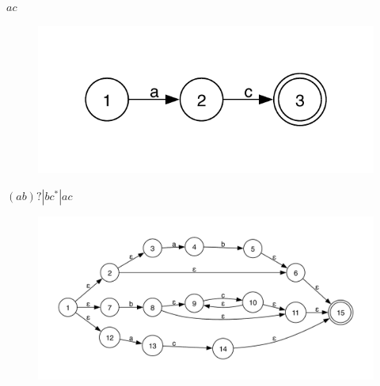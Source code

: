 \documentclass[12pt,onecolumn]{article}
\begin{document}


$ac$

\begin{figure}[h]
    \centering
    \includegraphics[width=\textwidth]{ac.pdf}
\end{figure}

\newpage
$\left(ab\right)?|bc^*|ac$

\begin{figure}[htp]
    \centering
    \includegraphics[width=\textwidth]{abc.pdf}
\end{figure}


\end{document}
